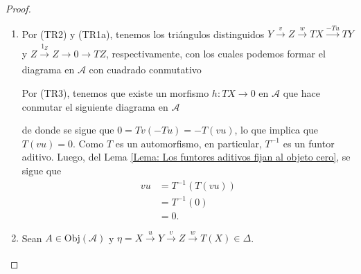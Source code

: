 \documentclass[tesis]{subfiles}
\begin{document}
\begin{proof}\leavevmode

    \begin{enumerate}[label=(\alph*)]
    
        \item Por (TR2) y (TR1a), tenemos los triángulos distinguidos $Y\xrightarrow[]{v} Z\xrightarrow[]{w}TX \xrightarrow[]{-Tu} TY$ y $Z\xrightarrow[]{1_Z}Z\to 0\to TZ$, respectivamente, con los cuales podemos formar el diagrama en $\mathscr{A}$ con cuadrado conmutativo
    \begin{center}
    \end{center}
    Por (TR3), tenemos que existe un morfismo $h:TX\to 0$ en $\mathscr{A}$ que hace conmutar el siguiente diagrama en $\mathscr{A}$
    \begin{center}
    \end{center}
    de donde se sigue que $0=Tv(-Tu)=-T(vu)$, lo que implica que $T(vu)=0$. Como $T$ es un automorfismo, en particular, $T^{-1}$ es un funtor aditivo. Luego, del Lema \ref{Lema: Los funtores aditivos fijan al objeto cero}, se sigue que
    \begin{align*}
        vu &= T^{-1}(T(vu)) \\
           &= T^{-1}(0) \\
           &= 0.
    \end{align*}

\item Sean $A\in\text{Obj}(\mathscr{A})$ y $\eta=X\xrightarrow[]{u}Y\xrightarrow[]{v}Z\xrightarrow[]{w}T(X)\in\Delta$. 


\end{enumerate}
\end{proof}
\end{document}
